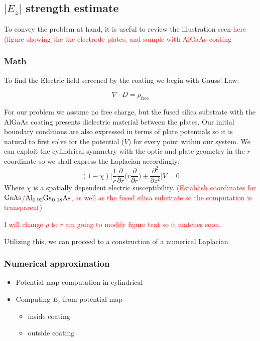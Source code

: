 \subsection{$|E_z|$ strength estimate}
To convey the problem at hand, it is useful to review the illustration seen \textcolor{red}{here (figure showing the the electrode plates, and sample with AlGaAs coating}
\subsubsection{Math}
To find the Electric field screened by the coating we begin with Gauss' Law:

\begin{equation}
\nabla \cdot D = \rho_\mathrm{free}
\end{equation}

For our problem we assume no free charge, but the fused silica substrate with the AlGaAs coating presents dielectric material between the plates. Our initial boundary conditions are also expressed in terms of plate potentials so it is natural to first solve for the potential ($V$) for every point within our system. We can exploit the cylindrical symmetry with the optic and plate geometry in the $r$ coordinate so we shall express the Laplacian accordingly:
\begin{equation}
(1-\chi)\bigg[\frac{1}{r}\frac{\partial}{\partial r} \bigg( r \frac{\partial}{\partial r}\bigg) + \frac{\partial^2}{\partial z^2}\bigg]V = 0
\end{equation}
Where $\chi$ is a spatially dependent electric susceptibility. (\textcolor{red}{Establish coordinates for $\mathrm{GaAs}$/$\mathrm{Al_{0.92}Ga_{0.08}As}$, as well as the fused silica substrate so the computation is transparent})
\\

\noindent\textcolor{red}{I will change $\rho$ to $r$ am going to modify figure text so it matches soon.}

Utilizing this, we can proceed to a construction of a numerical Laplacian.

\subsubsection{Numerical approximation}


\begin{itemize}
\item Potential map computation in cylindrical
\item Computing $E_z$ from potential map
\begin{itemize}
\item inside coating
\item outside coating
\end{itemize}
\end{itemize}


